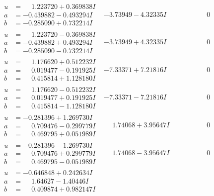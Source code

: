 \documentclass[1p]{elsarticle_modified}
\theoremstyle{definition}
\begin{document}
$$\begin{array}{c|c|c}
\begin{aligned}
u &= \phantom{-}1.223720 + 0.369838 I \\
a &= -0.439882 - 0.493294 I \\
b &= -0.285090 + 0.732214 I\end{aligned}
 & -3.73949 - 4.32335 I & \phantom{-0.000000 } 0 \\ \hline\begin{aligned}
u &= \phantom{-}1.223720 - 0.369838 I \\
a &= -0.439882 + 0.493294 I \\
b &= -0.285090 - 0.732214 I\end{aligned}
 & -3.73949 + 4.32335 I & \phantom{-0.000000 } 0 \\ \hline\begin{aligned}
u &= \phantom{-}1.176620 + 0.512232 I \\
a &= \phantom{-}0.019477 - 0.191925 I \\
b &= \phantom{-}0.415814 + 1.128180 I\end{aligned}
 & -7.33371 + 7.21816 I & \phantom{-0.000000 } 0 \\ \hline\begin{aligned}
u &= \phantom{-}1.176620 - 0.512232 I \\
a &= \phantom{-}0.019477 + 0.191925 I \\
b &= \phantom{-}0.415814 - 1.128180 I\end{aligned}
 & -7.33371 - 7.21816 I & \phantom{-0.000000 } 0 \\ \hline\begin{aligned}
u &= -0.281396 + 1.269730 I \\
a &= \phantom{-}0.709476 - 0.299779 I \\
b &= \phantom{-}0.469795 + 0.051989 I\end{aligned}
 & \phantom{-}1.74068 + 3.95647 I & \phantom{-0.000000 } 0 \\ \hline\begin{aligned}
u &= -0.281396 - 1.269730 I \\
a &= \phantom{-}0.709476 + 0.299779 I \\
b &= \phantom{-}0.469795 - 0.051989 I\end{aligned}
 & \phantom{-}1.74068 - 3.95647 I & \phantom{-0.000000 } 0 \\ \hline\begin{aligned}
u &= -0.646848 + 0.242634 I \\
a &= \phantom{-}1.64627 - 1.40446 I \\
b &= \phantom{-}0.409874 + 0.982147 I\end{aligned}

\end{array}$$
\end{document}
